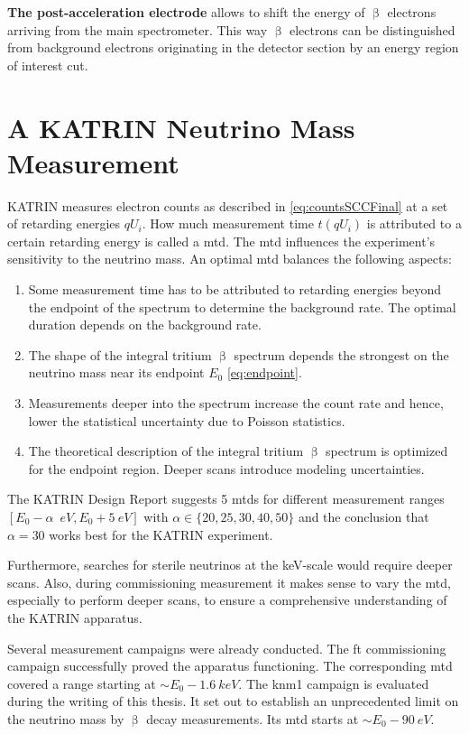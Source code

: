 {\par \textbf{The post-acceleration electrode} allows to shift the energy of $\upbeta$ electrons arriving from the main spectrometer. This way $\upbeta$ electrons can be distinguished from background electrons originating in the detector section by an energy region of interest cut.}



\section{A KATRIN Neutrino Mass Measurement}
KATRIN measures electron counts as described in \eqref{eq:countsSCCFinal} at a set of retarding energies ${qU_i}$. How much measurement time $t(qU_i)$ is attributed to a certain retarding energy is called a \gls{mtd}. The \gls{mtd} influences the experiment's sensitivity to the neutrino mass. An optimal \gls{mtd} balances the following aspects:
\begin{enumerate}
	\item Some measurement time has to be attributed to retarding energies beyond the endpoint of the spectrum to determine the background rate. The optimal duration depends on the background rate.
	\item The shape of the integral tritium $\upbeta$ spectrum depends the strongest on the neutrino mass near its endpoint $E_0$ \eqref{eq:endpoint}. 
	\item Measurements deeper into the spectrum increase the count rate and hence, lower the statistical uncertainty due to Poisson statistics.
	\item The theoretical description of the integral tritium $\upbeta$ spectrum is optimized for the endpoint region. Deeper scans introduce modeling uncertainties.
\end{enumerate}
The KATRIN Design Report \cite{Angrik:2005ep} suggests 5 \gls{mtd}s for different measurement ranges $[E_0-\alpha\;\SI{}{eV}, E_0 + \SI{5}{eV}]$ with $\alpha \in \{20, 25, 30, 40, 50\}$ and the conclusion that $\alpha=30$ works best for the KATRIN experiment.

Furthermore, searches for sterile neutrinos at the keV-scale would require deeper scans. Also, during commissioning measurement it makes sense to vary the \gls{mtd}, especially to perform deeper scans, to ensure a comprehensive understanding of the KATRIN apparatus.

Several measurement campaigns were already conducted. The \gls{ft} commissioning campaign successfully proved the apparatus functioning. The corresponding \gls{mtd} covered a range starting at $\sim E_0-\SI{1.6}{keV}$. The \gls{knm1} campaign is evaluated during the writing of this thesis. It set out to establish an unprecedented limit on the neutrino mass by $\upbeta$ decay measurements. Its \gls{mtd} starts at $\sim E_0-\SI{90}{eV}$.